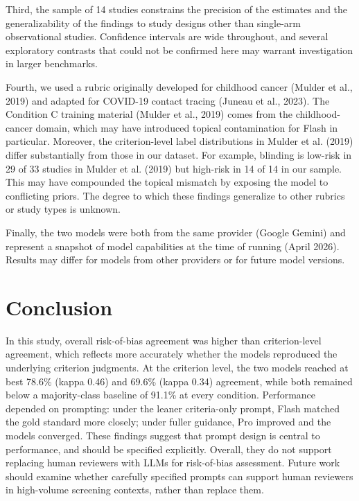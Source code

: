 \documentclass[11pt,a4paper]{article}
\begin{document}
Third, the sample of 14 studies constrains the precision of the estimates and the generalizability of the findings to study designs other than single-arm observational studies. Confidence intervals are wide throughout, and several exploratory contrasts that could not be confirmed here may warrant investigation in larger benchmarks.

Fourth, we used a rubric originally developed for childhood cancer (Mulder et al., 2019) and adapted for COVID-19 contact tracing (Juneau et al., 2023). The Condition C training material (Mulder et al., 2019) comes from the childhood-cancer domain, which may have introduced topical contamination for Flash in particular. Moreover, the criterion-level label distributions in Mulder et al. (2019) differ substantially from those in our dataset. For example, blinding is low-risk in 29 of 33 studies in Mulder et al. (2019) but high-risk in 14 of 14 in our sample. This may have compounded the topical mismatch by exposing the model to conflicting priors. The degree to which these findings generalize to other rubrics or study types is unknown.

Finally, the two models were both from the same provider (Google Gemini) and represent a snapshot of model capabilities at the time of running (April 2026). Results may differ for models from other providers or for future model versions.

\section{Conclusion}

In this study, overall risk-of-bias agreement was higher than criterion-level agreement, which reflects more accurately whether the models reproduced the underlying criterion judgments. At the criterion level, the two models reached at best 78.6\% (kappa 0.46) and 69.6\% (kappa 0.34) agreement, while both remained below a majority-class baseline of 91.1\% at every condition. Performance depended on prompting: under the leaner criteria-only prompt, Flash matched the gold standard more closely; under fuller guidance, Pro improved and the models converged. These findings suggest that prompt design is central to performance, and should be specified explicitly. Overall, they do not support replacing human reviewers with LLMs for risk-of-bias assessment. Future work should examine whether carefully specified prompts can support human reviewers in high-volume screening contexts, rather than replace them.
\end{document}
